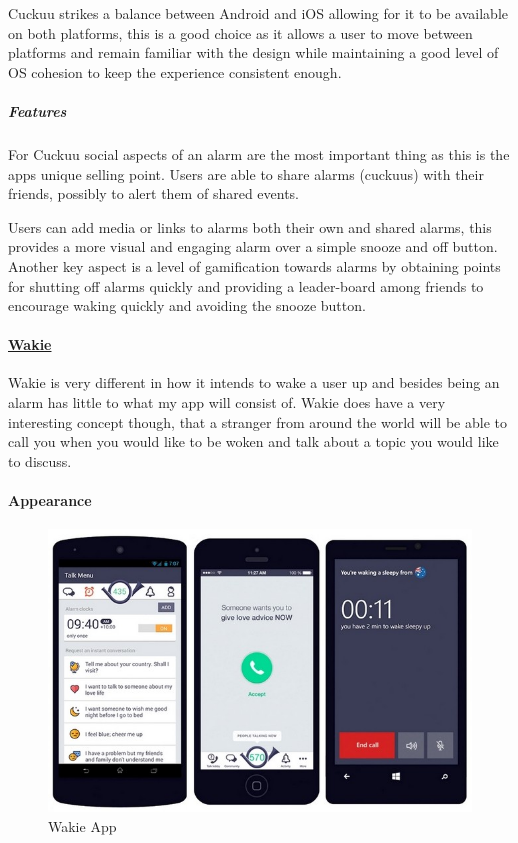 Cuckuu strikes a balance between Android and iOS allowing for it to be
available on both platforms, this is a good choice as it allows a user
to move between platforms and remain familiar with the design while
maintaining a good level of OS cohesion to keep the experience
consistent enough.

\subparagraph{Features}\label{features-1}

For Cuckuu social aspects of an alarm are the most important thing as
this is the apps unique selling point. Users are able to share alarms
(cuckuus) with their friends, possibly to alert them of shared events.

Users can add media or links to alarms both their own and shared alarms,
this provides a more visual and engaging alarm over a simple snooze and
off button. Another key aspect is a level of gamification towards alarms
by obtaining points for shutting off alarms quickly and providing a
leader-board among friends to encourage waking quickly and avoiding the
snooze button.

\paragraph{\texorpdfstring{\href{https://wakie.com/}{Wakie}}{Wakie}}\label{wakie}

Wakie is very different in how it intends to wake a user up and besides
being an alarm has little to what my app will consist of. Wakie does
have a very interesting concept though, that a stranger from around the
world will be able to call you when you would like to be woken and talk
about a topic you would like to discuss.

\paragraph{Appearance}\label{appearance-2}

\begin{figure}
\centering
\includegraphics{Images/wakie.jpg}
\caption{Wakie App}
\end{figure}

